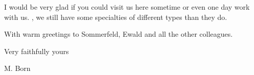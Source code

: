 \begin{letter}{4}
I would be very glad if you could visit us here sometime or even one day work with us. , we still have some specialties of different types than they do.

With warm greetings to Sommerfeld, Ewald and all the other colleagues.

Very faithfully yours

M. Born

\end{letter}
